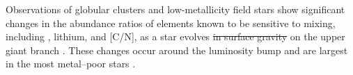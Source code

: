         




Observations of globular clusters and low-metallicity field stars show significant changes in the abundance ratios of elements known to be sensitive to mixing, including \ctwelvecthirteen, lithium, and [C/N], as a star evolves \sout{in surface gravity} on the upper giant branch \citep{Carbon1982, Pilachowski1986, Kraft1994, Shetrone2019}. 
These changes occur around the luminosity bump 
and are largest in the most metal--poor stars \citep[e.g.][]{Gratton2000}. 

